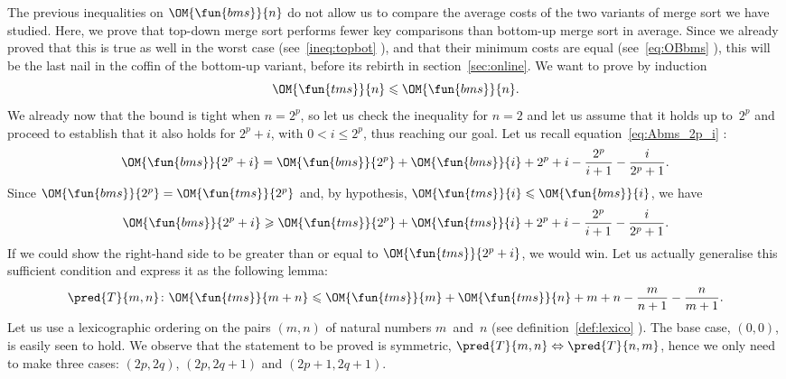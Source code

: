 The previous inequalities on \(\OM{\fun{bms}}{n}\) do not allow us to
compare the average costs of the two variants of merge sort we have
studied. Here, we prove that top\hyp{}down merge sort performs fewer
key comparisons than bottom\hyp{}up merge sort in average. Since we
already proved that this is true as well in the worst case
(see~\eqref{ineq:topbot} ), and that their
minimum costs are equal (see~\eqref{eq:OBbms} ),
this will be the last nail in the coffin of the bottom\hyp{}up
variant, before its rebirth in section~\vref{sec:online}. We want to
prove by induction
\begin{equation*}
\OM{\fun{tms}}{n} \leqslant \OM{\fun{bms}}{n}.
\end{equation*}
We already now that the bound is tight when \(n=2^p\), so let us check
the inequality for \(n=2\) and let us assume that it holds up
to~\(2^p\) and proceed to establish that it also holds for \(2^p+i\),
with \(0 < i \leqslant 2^p\), thus reaching our goal. Let us recall
equation~\eqref{eq:Abms_2p_i} :
\begin{equation*}
\OM{\fun{bms}}{2^p+i} = \OM{\fun{bms}}{2^p} + \OM{\fun{bms}}{i}
+ 2^p + i - \frac{2^p}{i+1} - \frac{i}{2^p+1}.
\end{equation*}
Since \(\OM{\fun{bms}}{2^p} = \OM{\fun{tms}}{2^p}\) and, by
hypothesis, \(\OM{\fun{tms}}{i} \leqslant \OM{\fun{bms}}{i}\), we have
\begin{equation}
\OM{\fun{bms}}{2^p+i} \geqslant \OM{\fun{tms}}{2^p} + \OM{\fun{tms}}{i}
+ 2^p + i - \frac{2^p}{i+1} - \frac{i}{2^p+1}.
\label{ineq:Atms_Abms}
\end{equation}
If we could show the right\hyp{}hand side to be greater than or equal
to \(\OM{\fun{tms}}{2^p+i}\), we would win. Let us actually generalise
this sufficient condition and express it as the following lemma:
\begin{equation*}
  \pred{T}{m,n} \colon
  \OM{\fun{tms}}{m+n} \leqslant \OM{\fun{tms}}{m} + \OM{\fun{tms}}{n} +
  m + n - \frac{m}{n+1} - \frac{n}{m+1}.
\end{equation*}
Let us use a lexicographic ordering on the pairs \((m,n)\) of natural
numbers \(m\)~and~\(n\) (see definition~\eqref{def:lexico}
). The base case, \((0,0)\), is easily seen to
hold. We observe that the statement to be proved is symmetric,
\(\pred{T}{m,n} \Leftrightarrow \pred{T}{n,m}\), hence we only need to
make three cases: \((2p,2q)\), \((2p,2q+1)\) and \((2p+1,2q+1)\).
